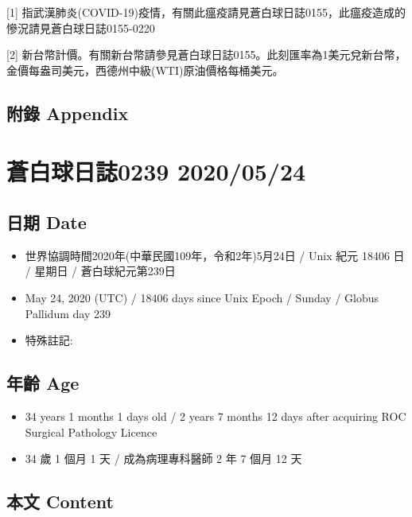 \documentclass[
]{article}
\providecommand{\tightlist}{%
  \setlength{\itemsep}{0pt}\setlength{\parskip}{0pt}}
\begin{document}
{[}1{]}
指武漢肺炎(COVID-19)疫情，有關此瘟疫請見蒼白球日誌0155，此瘟疫造成的慘況請見蒼白球日誌0155-0220

{[}2{]}
新台幣計價。有關新台幣請參見蒼白球日誌0155。此刻匯率為1美元兌新台幣，金價每盎司美元，西德州中級(WTI)原油價格每桶美元。

\hypertarget{ux9644ux9304-appendix-22}{%
\subsection{附錄 Appendix}\label{ux9644ux9304-appendix-22}}

\hypertarget{ux84bcux767dux7403ux65e5ux8a8c0239-20200524}{%
\section{蒼白球日誌0239
2020/05/24}\label{ux84bcux767dux7403ux65e5ux8a8c0239-20200524}}

\hypertarget{ux65e5ux671f-date-23}{%
\subsection{日期 Date}\label{ux65e5ux671f-date-23}}

\begin{itemize}
\tightlist
\item
  世界協調時間2020年(中華民國109年，令和2年)5月24日 / Unix 紀元 18406 日
  / 星期日 / 蒼白球紀元第239日
\item
  May 24, 2020 (UTC) / 18406 days since Unix Epoch / Sunday / Globus
  Pallidum day 239
\item
  特殊註記:
\end{itemize}

\hypertarget{ux5e74ux9f61-age-23}{%
\subsection{年齡 Age}\label{ux5e74ux9f61-age-23}}

\begin{itemize}
\tightlist
\item
  34 years 1 months 1 days old / 2 years 7 months 12 days after
  acquiring ROC Surgical Pathology Licence
\item
  34 歲 1 個月 1 天 / 成為病理專科醫師 2 年 7 個月 12 天
\end{itemize}

\hypertarget{ux672cux6587-content-23}{%
\subsection{本文 Content}\label{ux672cux6587-content-23}}
\end{document}
